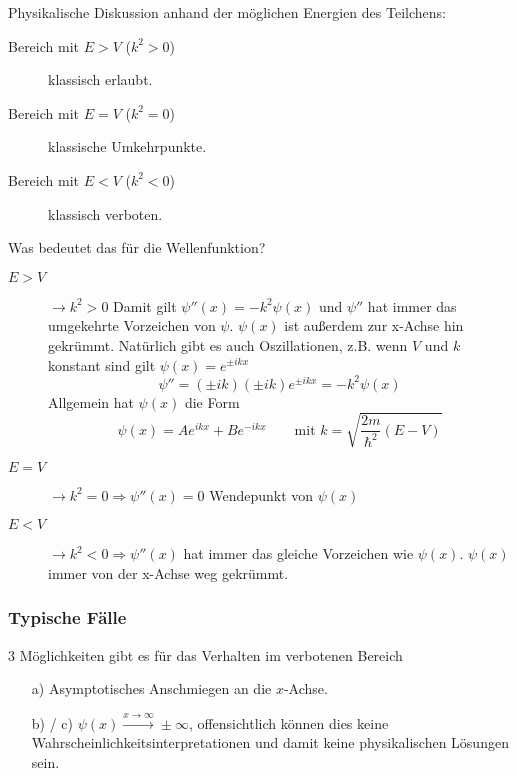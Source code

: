 \documentclass[oneside]{book}
\theoremstyle{definition}
\begin{document}
Physikalische Diskussion anhand der möglichen Energien des Teilchens:
\begin{description}
	\item[Bereich mit $E > V$ ($k^2 > 0$)] klassisch erlaubt.
	\item[Bereich mit $E = V$ ($k^2 = 0$)] klassische Umkehrpunkte.
	\item[Bereich mit $E < V$ ($k^2 < 0$)] klassisch verboten.
\end{description}
Was bedeutet das für die Wellenfunktion?
\begin{description}
\item[$E>V$] $\to k^2 > 0$ Damit gilt $\psi''(x) = -k^2 \psi(x)$ und $\psi''$ hat immer das umgekehrte Vorzeichen von $\psi$. $\psi(x)$ ist außerdem zur x-Achse hin gekrümmt. Natürlich gibt es auch Oszillationen, z.B. wenn $V$ und $k$ konstant sind gilt $\psi(x) = e^{\pm ikx}$
\[\psi'' = (\pm ik)(\pm ik)e^{\pm ikx} = -k^2 \psi(x)\]
Allgemein hat $\psi(x)$ die Form
$$\psi(x) = Ae^{ikx} + Be^{-ikx} \qquad \text{mit~} k=\sqrt{\frac{2m}{\hbar^2}(E-V)}$$
\item[$E=V$] $\to k^2=0 \Rightarrow \psi''(x) = 0$ Wendepunkt von $\psi(x)$
\item[$E<V$] $\to k^2 < 0 \Rightarrow \psi''(x)$ hat immer das gleiche Vorzeichen wie $\psi(x)$. $\psi(x)$ immer von der x-Achse weg gekrümmt.
\end{description}

\subsubsection{Typische Fälle}
3 Möglichkeiten gibt es für das Verhalten im verbotenen Bereich
\begin{itemize}
	\item[a)] Asymptotisches Anschmiegen an die $x$-Achse.
	\item[b) / c)] $\psi(x) \xrightarrow{x \to \infty} \pm \infty$, offensichtlich können dies keine Wahrscheinlichkeitsinterpretationen und damit keine physikalischen Lösungen sein.
\end{itemize}
\end{document}
